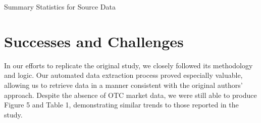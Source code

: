 \documentclass{article}
\begin{document}
\begin{table}[H]
  \centering
  \caption{Summary Statistics for Source Data}
  
  \label{tab:table3}
  \end{table}


\raggedright
\section{Successes and Challenges}
In our efforts to replicate the original study, we closely followed its methodology and logic. Our automated data extraction process proved especially valuable, allowing us to retrieve data in a manner consistent with the original authors’ approach. Despite the absence of OTC market data, we were still able to produce Figure 5 and Table 1, demonstrating similar trends to those reported in the study.



\end{document}
